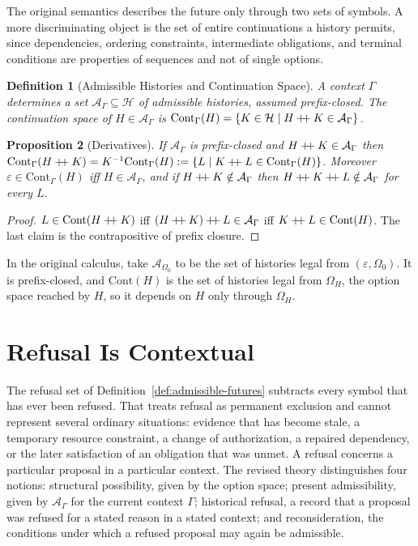 \documentclass[12pt,oneside,openany]{book}
\theoremstyle{spherepop}
\newtheorem{definition}{Definition}[chapter]
\newtheorem{proposition}[definition]{Proposition}
\theoremstyle{remarkstyle}
\newcommand{\hconcat}{\mathbin{+\mkern-5mu+}}
\newcommand{\calH}{\mathcal{H}}
\begin{document}
The original semantics describes the future only through two sets of symbols. A more discriminating object is the set of entire continuations a history permits, since dependencies, ordering constraints, intermediate obligations, and terminal conditions are properties of sequences and not of single options.

\begin{definition}[Admissible Histories and Continuation Space]
\label{def:cont}
A \emph{context} $\Gamma$ determines a set $\mathcal A_\Gamma\subseteq\calH$ of admissible histories, assumed prefix-closed. The \emph{continuation space} of $H\in\mathcal A_\Gamma$ is $\mathrm{Cont}_\Gamma(H)=\{K\in\calH\mid H\hconcat K\in\mathcal A_\Gamma\}$.
\end{definition}

\begin{proposition}[Derivatives]
\label{prop:derivative}
If $\mathcal A_\Gamma$ is prefix-closed and $H\hconcat K\in\mathcal A_\Gamma$ then $\mathrm{Cont}_\Gamma(H\hconcat K)=K^{-1}\mathrm{Cont}_\Gamma(H):=\{L\mid K\hconcat L\in\mathrm{Cont}_\Gamma(H)\}$. Moreover $\varepsilon\in\mathrm{Cont}_\Gamma(H)$ iff $H\in\mathcal A_\Gamma$, and if $H\hconcat K\notin\mathcal A_\Gamma$ then $H\hconcat K\hconcat L\notin\mathcal A_\Gamma$ for every $L$.
\end{proposition}

\begin{proof}
$L\in\mathrm{Cont}(H\hconcat K)$ iff $(H\hconcat K)\hconcat L\in\mathcal A_\Gamma$ iff $K\hconcat L\in\mathrm{Cont}(H)$. The last claim is the contrapositive of prefix closure.
\end{proof}

In the original calculus, take $\mathcal A_{\Omega_0}$ to be the set of histories legal from $(\varepsilon,\Omega_0)$. It is prefix-closed, and $\mathrm{Cont}(H)$ is the set of histories legal from $\Omega_H$, the option space reached by $H$, so it depends on $H$ only through $\Omega_H$.

\section{Refusal Is Contextual}

The refusal set of Definition~\ref{def:admissible-futures} subtracts every symbol that has ever been refused. That treats refusal as permanent exclusion and cannot represent several ordinary situations: evidence that has become stale, a temporary resource constraint, a change of authorization, a repaired dependency, or the later satisfaction of an obligation that was unmet. A refusal concerns a particular proposal in a particular context. The revised theory distinguishes four notions: structural possibility, given by the option space; present admissibility, given by $\mathcal A_\Gamma$ for the current context $\Gamma$; historical refusal, a record that a proposal was refused for a stated reason in a stated context; and reconsideration, the conditions under which a refused proposal may again be admissible.
\end{document}

